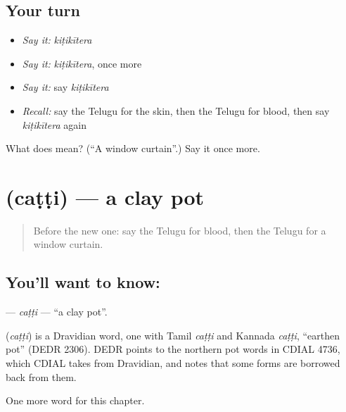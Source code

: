 \subsection*{Your turn}
\begin{itemize}
\raggedright
  \item \emph{Say it:} \emph{kiṭikītera}
  \item \emph{Say it:} \emph{kiṭikītera}, once more
  \item \emph{Say it:} say \emph{kiṭikītera}
  \item \emph{Recall:} say the Telugu for the skin, then the Telugu for blood, then say \emph{kiṭikītera} again
\end{itemize}

\begin{tcolorbox}[breakable,colback=teal!4,colframe=teal!35!black,title={Before you move on}]
What does  mean? (\textquotedblleft{}A window curtain\textquotedblright{}.) Say it once more.
\end{tcolorbox}
\section[\texorpdfstring{\te{చట్టి} (caṭṭi)}{చట్టి (caṭṭi)}]{ (caṭṭi) — a clay pot}

\label{lesson:TE-C129-catti}



\begin{quote}
Before the new one: say the Telugu for blood, then the Telugu for a window curtain.
\end{quote}

\subsection*{You'll want to know: }
\textbf{} — \emph{caṭṭi} — \textquotedblleft{}a clay pot\textquotedblright{}.

\begin{cousinweb}
\textbf{} (\emph{caṭṭi}) is a Dravidian word, one with Tamil \emph{caṭṭi} and Kannada \emph{caṭṭi}, \textquotedblleft{}earthen pot\textquotedblright{} (DEDR 2306). DEDR points to the northern pot words in CDIAL 4736, which CDIAL takes from Dravidian, and notes that some forms are borrowed back from them.
\end{cousinweb}

\begin{grammarlens}[title={What you've built}]
One more word for this chapter.
\end{grammarlens}

